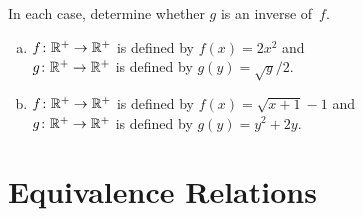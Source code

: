 \begin{enumerate}
 In each case, determine whether $g$ is an inverse of~$f$.
 \begin{enumerate}[(a)]
 \item \label{VerifyInverseExers-(x^2)}
$f \colon \mathbb{R}^+ \to \mathbb{R}^+$ is defined by $f(x) =2x^2$ and 
 \\ $g \colon \mathbb{R}^+ \to \mathbb{R}^+$ is defined by $g(y) = \sqrt{y}/2$.
 \item \label{VerifyInverseExers-(sqrt(x+1)-1)}
$f \colon \mathbb{R}^+ \to \mathbb{R}^+$ is defined by $f(x) = \sqrt{x+1} - 1$ and 
 \\ $g \colon \mathbb{R}^+ \to \mathbb{R}^+$ is defined by $g(y) = y^2 + 2y$.
 \end{enumerate}



\end{enumerate}

\section{Equivalence Relations}

